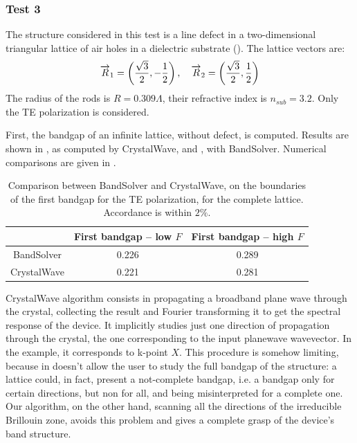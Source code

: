 \subsubsection{Test 3}

The structure considered in this test is a line defect in a two-dimensional 
triangular lattice of air holes in a dielectric substrate
(). The lattice vectors are:
\begin{equation*}
  \overrightarrow{R}_1 = \left( \frac{\sqrt{3}}{2}, -\frac{1}{2} \right),
  \quad \overrightarrow{R}_2 = \left( \frac{\sqrt{3}}{2}, \frac{1}{2} \right)
\end{equation*}
The radius of the rods is $R = 0.309 \Lambda$, their refractive index is
$n_{sub} = 3.2$. Only the TE polarization is considered.

First, the bandgap of an infinite lattice, without defect, is
computed. Results are shown in , as computed by
CrystalWave, and , with BandSolver. Numerical
comparisons are given in .

\begin{table}[htbp]
  \begin{center}
    \begin{tabular}{*{3}{c}}
      \hline
      & First bandgap -- low $F$ & First bandgap -- high $F$ \\
      \hline
      BandSolver & 0.226 & 0.289 \\
      CrystalWave & 0.221 & 0.281 \\
      \hline
    \end{tabular}
  \end{center}
  \caption{Comparison between BandSolver and CrystalWave, on the
  boundaries of the first bandgap for the TE polarization, for the
  complete lattice. Accordance is within $2\%$.}
  \label{tab:test_3}
\end{table}

CrystalWave algorithm consists in propagating a broadband
plane wave through the crystal, collecting the result and Fourier
transforming it to get the spectral response of the device. It implicitly
studies just one direction of propagation through the crystal, the one
corresponding to the input planewave wavevector. In the example, it
corresponds to k-point $X$. This procedure is somehow limiting,
because in doesn't allow the user to study the full bandgap of the
structure: a lattice could, in fact, present a not-complete bandgap, i.e. a bandgap only for
certain directions, but non for all, and being misinterpreted for a
complete one. Our algorithm, on the other hand, scanning all the
directions of the irreducible Brillouin zone, avoids this problem and
gives a complete grasp of the device's band structure.

